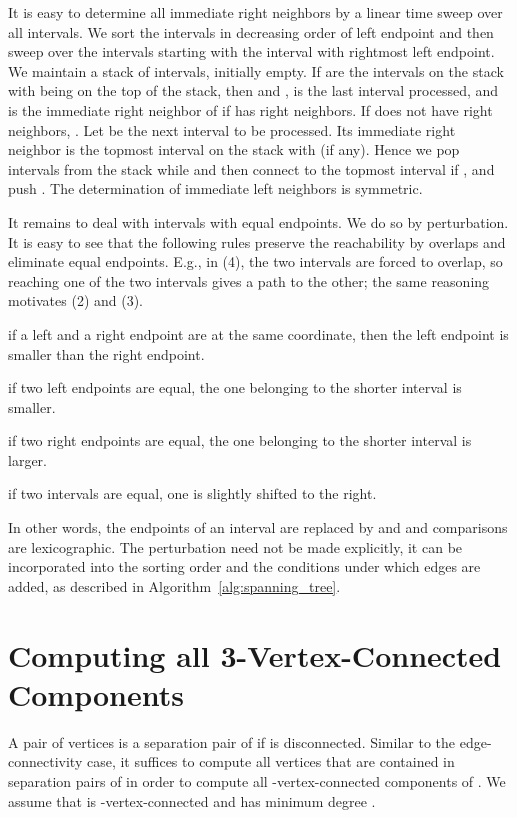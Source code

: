 \documentclass[paper=a4]{scrartcl}
\begin{document}
It is easy to determine all immediate right neighbors by a linear time sweep over all intervals. We sort the intervals in decreasing order of left endpoint and then sweep over the intervals starting with the interval with rightmost left endpoint. We maintain a stack  of intervals, initially empty. If  are the intervals on the stack with  being on the top of the stack, then  and ,  is the last interval processed, and  is the immediate right neighbor of  if  has right neighbors. If  does not have right neighbors, . Let  be the next interval to be processed. Its immediate right neighbor is the topmost interval  on the stack with  (if any). Hence we pop intervals  from the stack while  and then connect  to the topmost interval if , and push . The determination of immediate left neighbors is symmetric.

It remains to deal with intervals with equal endpoints. We do so by perturbation. It is easy to see that the following rules preserve the reachability by overlaps and eliminate equal endpoints. E.g., in (4), the two intervals are forced to overlap, so reaching one of the two intervals gives a path to the other; the same reasoning motivates (2) and (3).
\begin{compactenum}[(1)]
\item if a left and a right endpoint are at the same coordinate, then the left endpoint is smaller than the right endpoint.
\item if two left endpoints are equal, the one belonging to the shorter interval is smaller.
\item if two right endpoints are equal, the one belonging to the shorter interval is larger.
\item if two intervals are equal, one is slightly shifted to the right.
\end{compactenum}
In other words, the endpoints of an interval  are replaced by  and  and comparisons are lexicographic. The perturbation need not be made explicitly, it can be incorporated into the sorting order and the conditions under which edges are added, as described in Algorithm~\ref{alg:spanning_tree}.



\section{Computing all 3-Vertex-Connected Components}\label{3-Vertex Components}

A pair of vertices  is a separation pair of  if  is disconnected. Similar to the edge-connectivity case, it suffices to compute all vertices that are contained in separation pairs of  in order to compute all -vertex-connected components of . We assume that  is -vertex-connected and has minimum degree .
\end{document}
